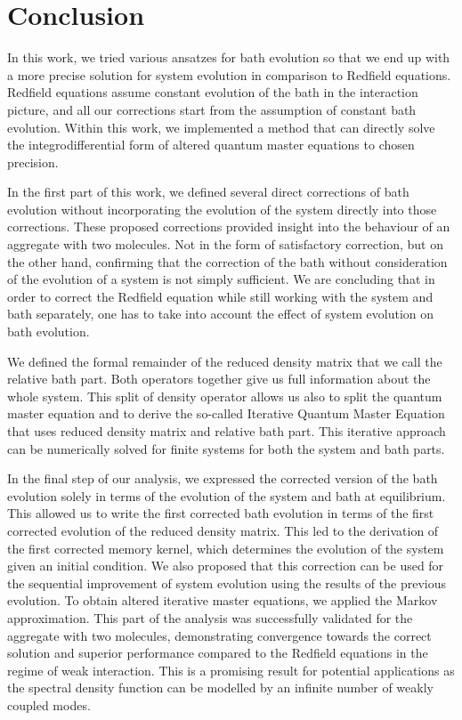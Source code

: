 \chapter*{Conclusion}

In this work, we tried various ansatzes for bath evolution so that we end up with a more precise solution for system evolution in comparison to Redfield equations. Redfield equations assume constant evolution of the bath in the interaction picture, and all our corrections start from the assumption of constant bath evolution. Within this work, we implemented a method that can directly solve the integrodifferential form of altered quantum master equations to chosen precision. 

In the first part of this work, we defined several direct corrections of bath evolution without incorporating the evolution of the system directly into those corrections. These proposed corrections provided insight into the behaviour of an aggregate with two molecules. Not in the form of satisfactory correction, but on the other hand, confirming that the correction of the bath without consideration of the evolution of a system is not simply sufficient. We are concluding that in order to correct the Redfield equation while still working with the system and bath separately, one has to take into account the effect of system evolution on bath evolution.

We defined the formal remainder of the reduced density matrix that we call the relative bath part. Both operators together give us full information about the whole system. This split of density operator allows us also to split the quantum master equation and to derive the so-called Iterative Quantum Master Equation that uses reduced density matrix and relative bath part. This iterative approach can be numerically solved for finite systems for both the system and bath parts.

In the final step of our analysis, we expressed the corrected version of the bath evolution solely in terms of the evolution of the system and bath at equilibrium. This allowed us to write the first corrected bath evolution in terms of the first corrected evolution of the reduced density matrix. This led to the derivation of the first corrected memory kernel, which determines the evolution of the system given an initial condition. We also proposed that this correction can be used for the sequential improvement of system evolution using the results of the previous evolution. To obtain altered iterative master equations, we applied the Markov approximation. This part of the analysis was successfully validated for the aggregate with two molecules, demonstrating convergence towards the correct solution and superior performance compared to the Redfield equations in the regime of weak interaction. This is a promising result for potential applications as the spectral density function can be modelled by an infinite number of weakly coupled modes. 

